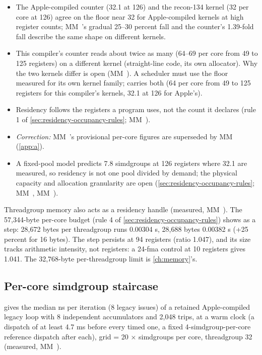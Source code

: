 \begin{itemize}
\item The Apple-compiled counter (32.1 at 126) and the recon-134 kernel (32 per core at 126) agree on the floor near 32
  for Apple-compiled kernels at high register counts; MM~'s gradual 25–30 percent fall and the counter's 1.39-fold
  fall describe the same shape on different kernels.
\item This compiler's counter reads about twice as many (64–69 per core from 49 to 125 registers) on a different kernel
  (straight-line code, its own allocator). Why the two kernels differ is open (MM~). A scheduler must use the
  floor measured for its own kernel family;  carries both (64 per core from 49 to 125
  registers for this compiler's kernels, 32.1 at 126 for Apple's).
\item Residency follows the registers a program uses, not the count it declares (rule 1 of \cref{sec:residency-occupancy-rules}; MM~).
\item \emph{Correction:} MM~'s provisional per-core figures are superseded by MM~ (\cref{app:a}).
\item A fixed-pool model predicts 7.8 simdgroups at 126 registers where 32.1 are measured, so residency is not one pool
  divided by demand; the physical capacity and allocation granularity are open (\cref{sec:residency-occupancy-rules}; MM~, MM~).
\end{itemize}

Threadgroup memory also acts as a residency handle (measured, MM~). The 57,344-byte per-core budget (rule 4 of
\cref{sec:residency-occupancy-rules}) shows as a step: 28,672 bytes per threadgroup runs 0.00304 s, 28,688 bytes 0.00382 s (+25 percent for 16
bytes). The step persists at 94 registers (ratio 1.047), and its size tracks arithmetic intensity, not registers: a
24-fma control at 10 registers gives 1.041. The 32,768-byte per-threadgroup limit is \cref{ch:memory}'s.

\subsection*{Per-core simdgroup staircase}

 gives the median ns per iteration (8 legacy issues) of a retained Apple-compiled legacy
 loop with 8 independent accumulators and 2,048 trips, at a warm clock (a dispatch of
at least 4.7 ms before every timed one, a fixed 4-simdgroup-per-core reference dispatch after each), grid = 20 ×
simdgroups per core, threadgroup 32 (measured, MM~).

